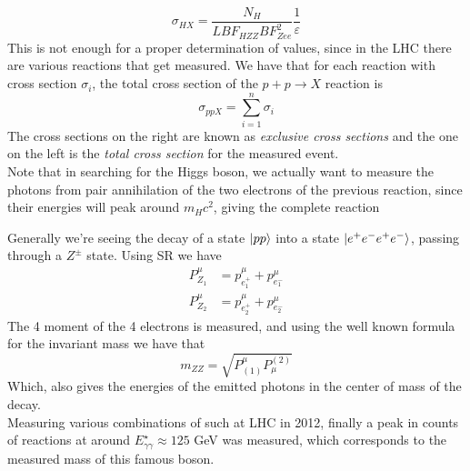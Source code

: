 \documentclass[../qm.tex]{subfiles}
\begin{document}
\begin{equation*}
	\sigma_{HX}=\frac{N_H}{LBF_{HZZ}BF_{Zee}^2}\frac{1}{\varepsilon}
\end{equation*}
This is not enough for a proper determination of values, since in the LHC there are various reactions that get measured. We have that for each reaction with cross section $\sigma_i$, the total cross section of the $p+p\to X$ reaction is
\begin{equation}
	\sigma_{ppX}=\sum_{i=1}^n\sigma_i
	\label{eq:exccs}
\end{equation}
The cross sections on the right are known as \emph{exclusive cross sections} and the one on the left is the \emph{total cross section} for the measured event.\\
Note that in searching for the Higgs boson, we actually want to measure the photons from pair annihilation of the two electrons of the previous reaction, since their energies will peak around $m_Hc^2$, giving the complete reaction
\begin{figure}[H]
	\centering
\end{figure}
Generally we're seeing the decay of a state $\ket{pp}$ into a state $\ket{e^+e^-e^+e^-}$, passing through a $Z^\pm$ state. Using SR we have
\begin{equation}
	\begin{aligned}
		P^\mu_{Z_1}&=p^\mu_{e^+_1}+p^\mu_{e^-_1}\\
		P^\mu_{Z_2}&=p^\mu_{e^+_2}+p^\mu_{e^-_2}
	\end{aligned}
	\label{eq:4momzz}
\end{equation}
The 4 moment of the 4 electrons is measured, and using the well known formula for the invariant mass we have that
\begin{equation*}
	m_{ZZ}=\sqrt{P^\mu_{(1)}P_\mu^{(2)}}
\end{equation*}
Which, also gives the energies of the emitted photons in the center of mass of the decay.\\
Measuring various combinations of such at LHC in 2012, finally a peak in counts of reactions at around $E^\star_{\gamma\gamma}\approx125$ GeV was measured, which corresponds to the measured mass of this famous boson.
\end{document}
